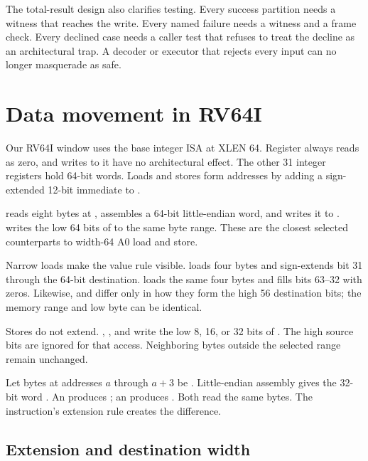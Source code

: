 The total-result design also clarifies testing. Every success partition needs
a witness that reaches the write. Every named failure needs a witness and a
frame check. Every declined case needs a caller test that refuses to treat the
decline as an architectural trap. A decoder or executor that rejects every
input can no longer masquerade as safe.

\section{Data movement in RV64I}

Our RV64I window uses the base integer ISA at XLEN 64. Register 
always reads as zero, and writes to it have no architectural effect. The other
31 integer registers hold 64-bit words. Loads and stores form addresses by
adding a sign-extended 12-bit immediate to 
\autocite{riscv2026unpriv}.

 reads eight bytes at , assembles a 64-bit
little-endian word, and writes it to .  writes
the low 64 bits of  to the same byte range. These are the closest
selected counterparts to width-64 A0 load and store.

Narrow loads make the value rule visible.  loads four bytes and
sign-extends bit 31 through the 64-bit destination.  loads the same
four bytes and fills bits 63--32 with zeros. Likewise,  and
 differ only in how they form the high 56 destination bits; the
memory range and low byte can be identical.

Stores do not extend. , , and  write the low 8,
16, or 32 bits of . The high source bits are ignored for that
access. Neighboring bytes outside the selected range remain unchanged.

\begin{example}[title={One RV64 word load, two destination values}]
Let bytes at addresses \(a\) through \(a+3\) be .
Little-endian assembly gives the 32-bit word . An 
produces ; an  produces
. Both read the same bytes. The instruction's extension
rule creates the difference.
\end{example}

\subsection{Extension and destination width}

